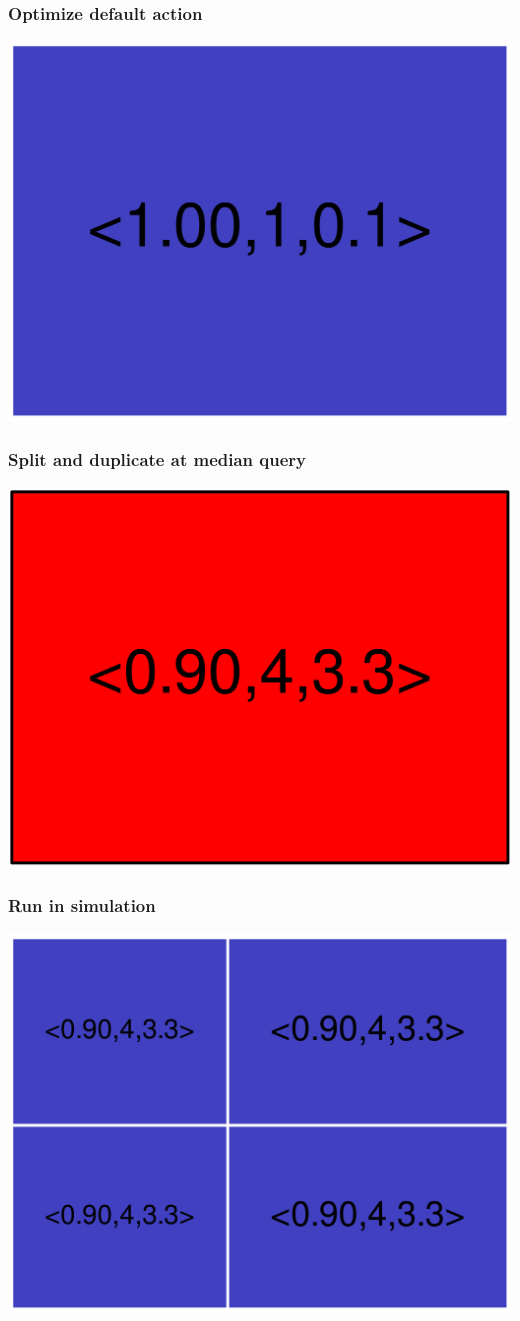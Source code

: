 \begin{frame}
\frametitle{Optimize default action}
\begin{centering}
\includegraphics[width=8.5 cm]{remy-graph/graph/test0.pdf}

\end{centering}
\end{frame}

\begin{frame}
\frametitle{Split and duplicate at median query}
\begin{centering}
\includegraphics[width=8.5 cm]{remy-graph/graph/test1.pdf}

\end{centering}
\end{frame}

\begin{frame}
\frametitle{Run in simulation}
\begin{centering}
\includegraphics[width=8.5 cm]{remy-graph/graph/test2.pdf}

\end{centering}
\end{frame}

